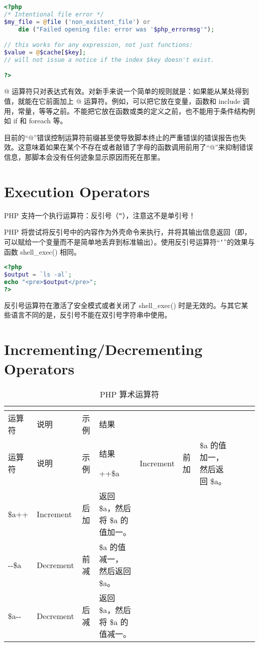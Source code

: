 \begin{lstlisting}[language=PHP]
<?php
/* Intentional file error */
$my_file = @file ('non_existent_file') or
    die ("Failed opening file: error was '$php_errormsg'");

// this works for any expression, not just functions:
$value = @$cache[$key];
// will not issue a notice if the index $key doesn't exist.

?>
\end{lstlisting}

@ 运算符只对表达式有效。对新手来说一个简单的规则就是：如果能从某处得到值，就能在它前面加上 @ 运算符。例如，可以把它放在变量，函数和 include 调用，常量，等等之前。不能把它放在函数或类的定义之前，也不能用于条件结构例如 if 和 foreach 等。

目前的“@”错误控制运算符前缀甚至使导致脚本终止的严重错误的错误报告也失效。这意味着如果在某个不存在或者敲错了字母的函数调用前用了“@”来抑制错误信息，那脚本会没有任何迹象显示原因而死在那里。



\section{Execution Operators}


PHP 支持一个执行运算符：反引号（\texttt{``}），注意这不是单引号！

PHP 将尝试将反引号中的内容作为外壳命令来执行，并将其输出信息返回（即，可以赋给一个变量而不是简单地丢弃到标准输出）。使用反引号运算符“\texttt{`}”的效果与函数 shell\_exec() 相同。

\begin{lstlisting}[language=PHP]
<?php
$output = `ls -al`;
echo "<pre>$output</pre>";
?>
\end{lstlisting}

反引号运算符在激活了安全模式或者关闭了 shell\_exec() 时是无效的。与其它某些语言不同的是，反引号不能在双引号字符串中使用。


\section{Incrementing/Decrementing Operators}


\begin{longtable}{|m{35pt}|m{130pt}|m{50pt}|m{150pt}|}
\tabularnewline\hline
运算符	&说明	&示例	&结果
\endhead

\caption{PHP 算术运算符}\\
\hline
运算符	&说明	&示例	&结果
\endfirsthead

\endfoot

\endlastfoot
\hline
++\$a	&Increment		&  前加	&\$a 的值加一，然后返回 \$a。\\
\hline
\$a++	&Increment		&后加	& 返回 \$a，然后将 \$a 的值加一。\\
\hline
-\/-\$a	&Decrement	&前减	&\$a 的值减一， 然后返回 \$a。\\
\hline
\$a-\/- 	&Decrement	&后减	&返回 \$a，然后将 \$a 的值减一。\\
\hline
\end{longtable}


